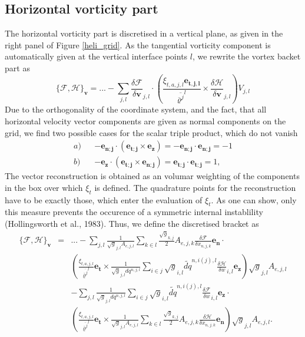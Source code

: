 \subsection{Horizontal vorticity part}
The horizontal vorticity part is discretised in a vertical plane, as given
in the right panel of Figure \ref{heli_grid}. As the tangential vorticity
component is automatically given at the vertical interface points $l$, we
rewrite the vortex backet part as
\begin{displaymath}
 \{\mathcal{F},\mathcal{H}\}_{\mathbf{v}}=...
-\sum_{j,l}\frac{\delta\mathcal{F}}{\delta\mathbf{v}}_{j,l}\cdot
\left(\frac{\xi_{t,a,j,l}\mathbf{e_{t,j,l}}}
{\overline{\overline{\varrho}^j}^l}\times
\frac{\delta\mathcal{H}}{\delta\mathbf{v}}_{j,l}\right)V_{j,l}
\end{displaymath}
Due to the orthogonality of the coordinate system, and the fact, that all
horizontal velocity vector components are given as normal components on the
grid, we find two possible cases for the scalar triple product, which do not
vanish
\begin{eqnarray*}
  a)&&-\mathbf{e_{n;j}}\cdot(\mathbf{e_{t;j}}\times\mathbf{e_z})=
      -\mathbf{e_{n;j}}\cdot\mathbf{e_{n;j}}=-1\\
  b)&&-\mathbf{e_z}\cdot(\mathbf{e_{t;j}}\times\mathbf{e_{n;j}})=
     \mathbf{e_{t;j}}\cdot\mathbf{e_{t;j}}=1,
\end{eqnarray*}
The vector reconstruction is obtained as an volumar weighting of the components
in the box over which $\xi_t$ is defined. The quadrature points for the
reconstruction have to be exactly those, which enter the evaluation of
$\xi_t$. As one can show, only this measure prevents the occurence of a symmetric internal
instablility (Hollingsworth et al., 1983). Thus, we define the discretised bracket as
\begin{eqnarray*}
 \{\mathcal{F},\mathcal{H}\}_{\mathbf{v}}&=&...
-\sum_{j,l}\frac{1}{\sqrt{g}_{j,l}A_{e,j,l}}\sum_{k \in l}\frac{\sqrt{g}_{k,j}}{2}A_{e,j,k}
\frac{\delta\mathcal{F}}{\delta\dot{x}_{n,j,k}}\mathbf{e_n}\cdot\\
&&\left(\frac{\xi_{t,a,j,l}}
{\overline{\overline{\varrho}^j}^l}\mathbf{e_t}\times
\frac{1}{\sqrt{g}_{j,l}dq^{n,j,l}}\sum_{i\in j}\sqrt{g}_{i,l}\widetilde{dq}^{n,i(j),l}
\frac{\delta\mathcal{H}}{\delta w}_{i,l}\mathbf{e_z}\right)\sqrt{g}_{j,l}A_{e,j,l}\\
&&
-\sum_{j,l}\frac{1}{\sqrt{g}_{j,l}dq^{n,j,l}}\sum_{i\in j}
\sqrt{g}_{i,l}\widetilde{dq}^{n,i(j),l}\frac{\delta\mathcal{F}}{\delta w}_{i,l}\mathbf{e_z}
\cdot\\
&&\left(\frac{\xi_{t,a,j,l}}{\overline{\overline{\varrho}^j}^l}\mathbf{e_t}\times
\frac{1}{\sqrt{g}_{j,l}A_{e,j,l}}\sum_{k \in l}\frac{\sqrt{g}_{k,j}}{2}A_{e,j,k}
\frac{\delta\mathcal{H}}{\delta\dot{x}_{n,j,k}}\mathbf{e_n}\right)\sqrt{g}_{j,l}A_{e,j,l}.
\end{eqnarray*}
